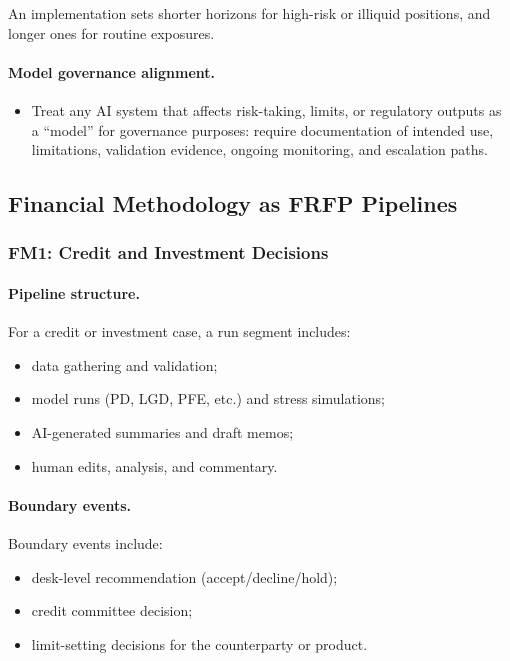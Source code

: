 An implementation sets shorter horizons for high-risk or illiquid positions,
and longer ones for routine exposures.
\paragraph{Model governance alignment.}
\begin{itemize}
  \item Treat any AI system that affects risk-taking, limits, or regulatory outputs as a “model” for
        governance purposes: require documentation of intended use, limitations, validation evidence,
        ongoing monitoring, and escalation paths.
\end{itemize}
\subsection{Financial Methodology as FRFP Pipelines}

\subsubsection*{FM1: Credit and Investment Decisions}

\paragraph{Pipeline structure.}
For a credit or investment case, a run segment includes:

\begin{itemize}
  \item data gathering and validation;
  \item model runs (PD, LGD, PFE, etc.) and stress simulations;
  \item AI-generated summaries and draft memos;
  \item human edits, analysis, and commentary.
\end{itemize}

\paragraph{Boundary events.}
Boundary events include:

\begin{itemize}
  \item desk-level recommendation (accept/decline/hold);
  \item credit committee decision;
  \item limit-setting decisions for the counterparty or product.
\end{itemize}


